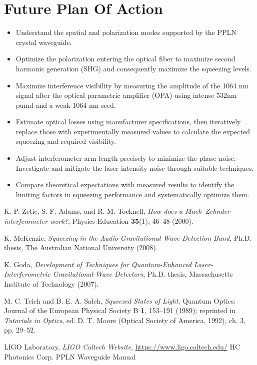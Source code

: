 \documentclass[colorlinks=true,pdfstartview=FitV,linkcolor=blue,
citecolor=red,urlcolor=magenta]{ligodoc}
\begin{document}
\section{Future Plan Of Action}

\begin{itemize}
    \item Understand the spatial and polarization modes supported by the PPLN crystal waveguide.
    \item Optimize the polarization entering the optical fiber to maximize second harmonic generation (SHG) and consequently maximize the squeezing levels.
    \item Maximize interference visibility by measuring the amplitude of the 1064 nm signal after the optical parametric amplifier (OPA) using intense 532nm pumd and a weak 1064 nm seed.
    \item Estimate optical losses using manufacturer specifications, then iteratively replace those with experimentally measured values to calculate the expected squeezing and required visibility.
    \item Adjust interferometer arm length precisely to minimize the phase noise. Investigate and mitigate the laser intensity noise through suitable techniques.
    \item Compare theoretical expectations with measured results to identify the limiting factors in squeezing performance and systematically optimize them. 
\end{itemize}


\begin{thebibliography}{9}

\label{1}
K. P. Zetie, S. F. Adams, and R. M. Tocknell, 
\emph{How does a Mach–Zehnder interferometer work?}, 
Physics Education \textbf{35}(1), 46–48 (2000).

K. McKenzie, 
\emph{Squeezing in the Audio Gravitational Wave Detection Band}, 
Ph.D. thesis, The Australian National University (2008).

K. Goda, 
\emph{Development of Techniques for Quantum-Enhanced Laser-Interferometric Gravitational-Wave Detectors}, 
Ph.D. thesis, Massachusetts Institute of Technology (2007).

M. C. Teich and B. E. A. Saleh, 
\emph{Squeezed States of Light}, 
Quantum Optics: Journal of the European Physical Society B \textbf{1}, 153–191 (1989); reprinted in \emph{Tutorials in Optics}, ed. D. T. Moore (Optical Society of America, 1992), ch. 3, pp. 29–52.

LIGO Laboratory, \emph{LIGO Caltech Website}, \url{https://www.ligo.caltech.edu/}
HC Photonics Corp.
PPLN Waveguide Manual
\end{thebibliography}
\end{document}
